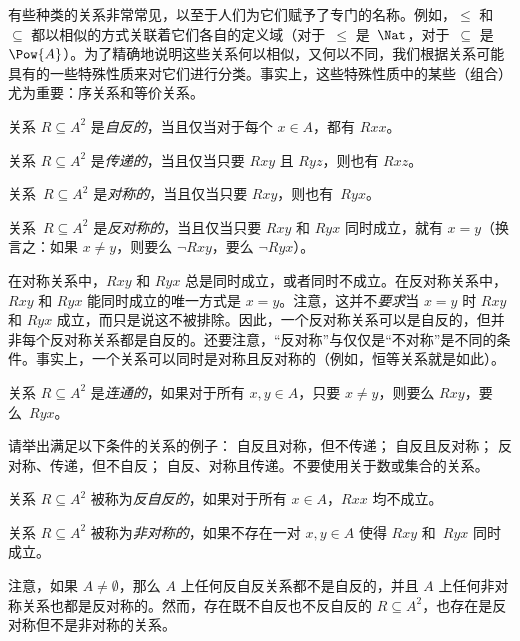 \documentclass[../../../include/open-logic-section]{subfiles}
\begin{document}

\begin{intro}
有些种类的关系非常常见，以至于人们为它们赋予了专门的名称。例如，$\le$ 和~$\subseteq$ 都以相似的方式关联着它们各自的定义域（对于~$\le$ 是~$\Nat$，对于~$\subseteq$ 是~$\Pow{A}$）。为了精确地说明这些关系何以相似，又何以不同，我们根据关系可能具有的一些特殊性质来对它们进行分类。事实上，这些特殊性质中的某些（组合）尤为重要：序关系和等价关系。
\end{intro}

\begin{defn}[自反性]
关系 $R \subseteq A^2$ 是\emph{自反的}，当且仅当对于每个 $x \in A$，都有 $Rxx$。
\end{defn}

\begin{defn}[传递性]
关系 $R \subseteq A^2$ 是\emph{传递的}，当且仅当只要 $Rxy$ 且 $Ryz$，则也有 $Rxz$。
\end{defn}

\begin{defn}[对称性]
关系~$R \subseteq A^2$ 是\emph{对称的}，当且仅当只要 $Rxy$，则也有~$Ryx$。
\end{defn}

\begin{defn}[反对称性]
关系~$R \subseteq A^2$ 是\emph{反对称的}，当且仅当只要 $Rxy$ 和 $Ryx$ 同时成立，就有 $x=y$（换言之：如果 $x\neq y$，则要么 $\lnot Rxy$，要么 $\lnot Ryx$）。
\end{defn}

\begin{explain}
在对称关系中，$Rxy$ 和 $Ryx$ 总是同时成立，或者同时不成立。在反对称关系中，$Rxy$ 和 $Ryx$ 能同时成立的唯一方式是 $x = y$。注意，这并不\emph{要求}当 $x = y$ 时 $Rxy$ 和 $Ryx$ 成立，而只是说这不被排除。因此，一个反对称关系可以是自反的，但并非每个反对称关系都是自反的。还要注意，“反对称”与仅仅是“不对称”是不同的条件。事实上，一个关系可以同时是对称且反对称的（例如，恒等关系就是如此）。
\end{explain}

\begin{defn}[连通性]
关系 $R \subseteq A^2$ 是\emph{连通的}，如果对于所有 $x,y\in A$，只要 $x \neq y$，则要么 $Rxy$，要么~$Ryx$。
\end{defn}

\begin{prob}
请举出满足以下条件的关系的例子： 自反且对称，但不传递； 自反且反对称； 反对称、传递，但不自反； 自反、对称且传递。不要使用关于数或集合的关系。
\end{prob}

\begin{defn}[反自反性]
关系 $R \subseteq A^2$ 被称为\emph{反自反的}，如果对于所有 $x \in A$，$Rxx$ 均不成立。
\end{defn}

\begin{defn}[非对称性]
关系 $R \subseteq A^2$ 被称为\emph{非对称的}，如果不存在一对 $x,y\in A$ 使得 $Rxy$ 和~$Ryx$ 同时成立。
\end{defn}

注意，如果 $A \neq \emptyset$，那么 $A$ 上任何反自反关系都不是自反的，并且 $A$ 上任何非对称关系也都是反对称的。然而，存在既不自反也不反自反的 $R \subseteq A^2$，也存在是反对称但不是非对称的关系。
\end{document}
